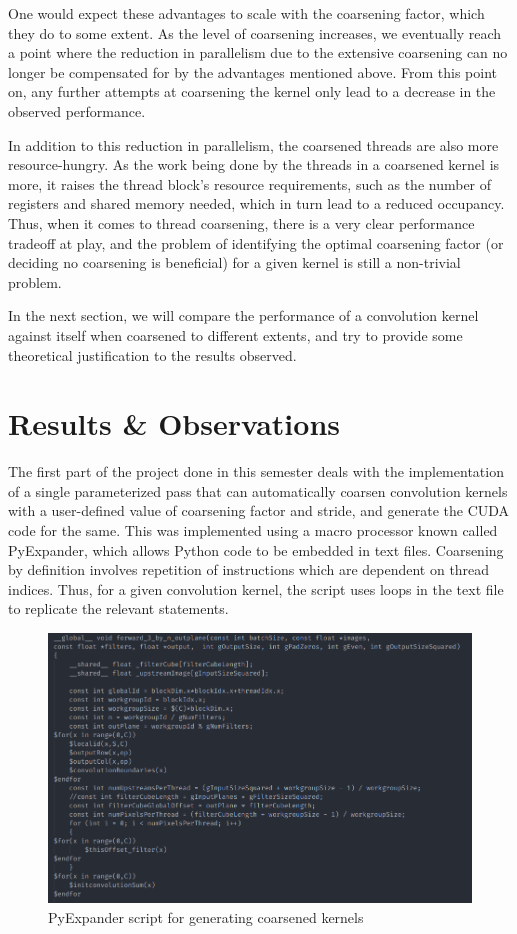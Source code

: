 One would expect these advantages to scale with the coarsening factor, which they do to some extent. As the level of coarsening increases, we eventually reach a point where the reduction in parallelism due to the extensive coarsening can no longer be compensated for by the advantages mentioned above. From this point on, any further attempts at coarsening the kernel only lead to a decrease in the observed performance.  

In addition to this reduction in parallelism, the coarsened threads are also more resource-hungry. As the work being done by the threads in a coarsened kernel is more, it raises the thread block's resource requirements, such as the number of registers and shared memory needed, which in turn lead to a reduced occupancy. Thus, when it comes to thread coarsening, there is a very clear performance tradeoff at play, and the problem of identifying the optimal coarsening factor (or deciding no coarsening is beneficial) for a given kernel is still a non-trivial problem.

In the next section, we will compare the performance of a convolution kernel against itself when coarsened to different extents, and try to provide some theoretical justification to the results observed.

\section{Results \& Observations} \label{sec:predict_coarsening}

The first part of the project done in this semester deals with the implementation of a single parameterized pass that can automatically coarsen convolution kernels with a user-defined value of coarsening factor and stride, and generate the CUDA code for the same. This was implemented using a macro processor known called PyExpander, which allows Python code to be embedded in text files. Coarsening by definition involves repetition of instructions which are dependent on thread indices. Thus, for a given convolution kernel, the script uses loops in the text file to replicate the relevant statements.

\begin{figure}[ht]
	\centering
	\includegraphics[scale=0.45]{Pictures/ch3/script.png}
	\caption{\small PyExpander script for generating coarsened kernels}
\end{figure}

